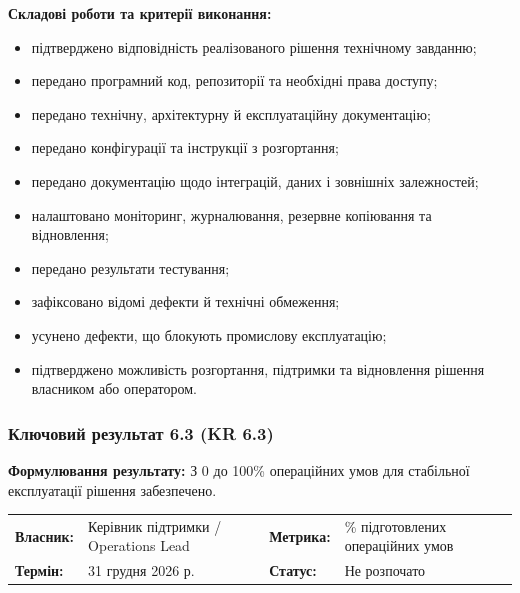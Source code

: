 \documentclass{article}
\begin{document}
\vspace{10pt}
\textbf{Складові роботи та критерії виконання:}
\begin{itemize}
    \item підтверджено відповідність реалізованого рішення технічному завданню;
    \item передано програмний код, репозиторії та необхідні права доступу;
    \item передано технічну, архітектурну й експлуатаційну документацію;
    \item передано конфігурації та інструкції з розгортання;
    \item передано документацію щодо інтеграцій, даних і зовнішніх залежностей;
    \item налаштовано моніторинг, журналювання, резервне копіювання та відновлення;
    \item передано результати тестування;
    \item зафіксовано відомі дефекти й технічні обмеження;
    \item усунено дефекти, що блокують промислову експлуатацію;
    \item підтверджено можливість розгортання, підтримки та відновлення рішення власником або оператором.
\end{itemize}

\subsubsection{Ключовий результат 6.3 (KR 6.3)}

\textbf{Формулювання результату:} З 0 до 100\% операційних умов для стабільної експлуатації рішення забезпечено.

\noindent\begin{tabular}{@{}p{2.2cm}p{4.5cm}p{2.2cm}p{4.5cm}@{}}
\toprule
\textbf{Власник:} & Керівник підтримки / Operations Lead & \textbf{Метрика:} & \% підготовлених операційних умов \\
\textbf{Термін:} & 31 грудня 2026 р. & \textbf{Статус:} & Не розпочато \\
\bottomrule
\end{tabular}
\end{document}
